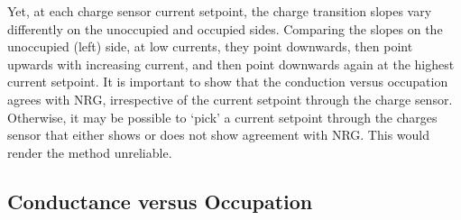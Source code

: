 Yet, at each charge sensor current setpoint, the charge transition slopes vary differently on the unoccupied and occupied sides. Comparing the slopes on the unoccupied (left) side, at low currents, they point downwards, then point upwards with increasing current, and then point downwards again at the highest current setpoint. It is important to show that the conduction versus occupation agrees with NRG, irrespective of the current setpoint through the charge sensor. Otherwise, it may be possible to `pick' a current setpoint through the charges sensor that either shows or does not show agreement with NRG. This would render the method unreliable. 




\subsection{Conductance versus Occupation}




